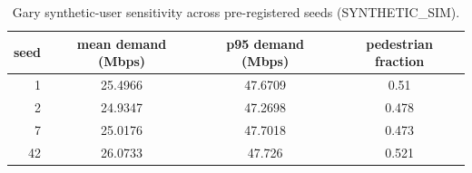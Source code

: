 \begin{table}[h]
\centering
\caption{Gary synthetic-user sensitivity across pre-registered seeds (SYNTHETIC\_SIM).}
\begin{tabular}{rccc}\toprule
seed & mean demand (Mbps) & p95 demand (Mbps) & pedestrian fraction \\\midrule
1 & 25.4966 & 47.6709 & 0.51 \\
2 & 24.9347 & 47.2698 & 0.478 \\
7 & 25.0176 & 47.7018 & 0.473 \\
42 & 26.0733 & 47.726 & 0.521 \\
\bottomrule\end{tabular}
\end{table}
